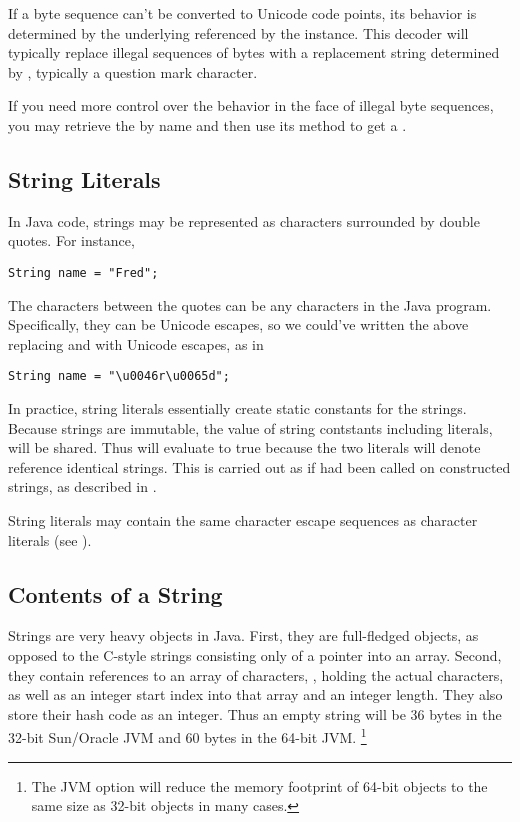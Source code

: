If a byte sequence can't be converted to Unicode code points, its
behavior is determined by the underlying 
referenced by the  instance.  This decoder will
typically replace illegal sequences of bytes with a replacement string
determined by , typically a
question mark character.  

If you need more control over the behavior in the face of illegal byte
sequences, you may retrieve the  by name and then use
its  method to get a .

\subsection{String Literals}

In Java code, strings may be represented as characters surrounded
by double quotes.  For instance,
%
\begin{verbatim}
String name = "Fred";
\end{verbatim}
%
The characters between the quotes can be any characters in the Java
program.  Specifically, they can be Unicode escapes, so we could've
written the above replacing  and  with Unicode
escapes, as in
%
\begin{verbatim}
String name = "\u0046r\u0065d";
\end{verbatim}

In practice, string literals essentially create static constants for
the strings.  Because strings are immutable, the value of string
contstants including literals, will be shared.  Thus  will evaluate to true because the two literals will denote
reference identical strings.  This is carried out as if
 had been called on constructed strings, as described
in .

String literals may contain the same character escape sequences as
character literals (see ).



\subsection{Contents of a String}

Strings are very heavy objects in Java.  First, they are full-fledged
objects, as opposed to the C-style strings consisting only of a
pointer into an array.  Second, they contain references to an array of
characters, , holding the actual characters, as well as
an integer start index into that array and an integer length.  They
also store their hash code as an integer.  Thus an empty string will
be 36 bytes in the 32-bit Sun/Oracle JVM and 60 bytes in the 64-bit
JVM.%
%
\footnote{The JVM option  will reduce
the memory footprint of 64-bit objects to the same size as 32-bit
objects in many cases.}

